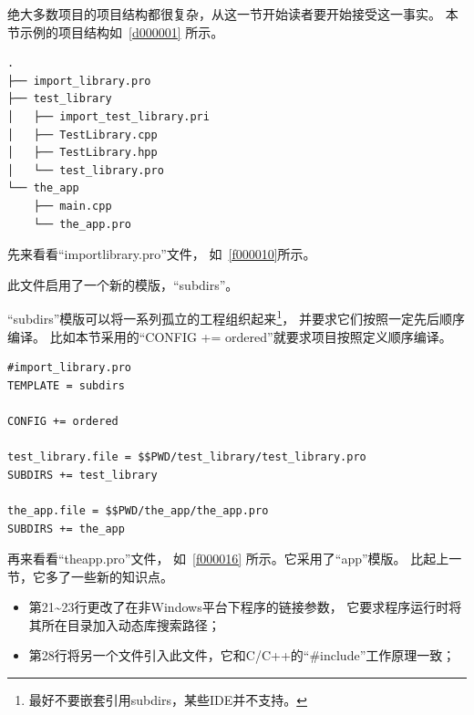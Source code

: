 绝大多数项目的项目结构都很复杂，从这一节开始读者要开始接受这一事实。
本节示例的项目结构如\treeindexnumbernameone\ \ref{d000001}
所示。

\label{d000001}    %
\begin{lstlisting}[caption=GoodLuck,
numbers=none,
title=\treeindexnumbernameone \thetreeindexnumber
]
.
├── import_library.pro
├── test_library
│   ├── import_test_library.pri
│   ├── TestLibrary.cpp
│   ├── TestLibrary.hpp
│   └── test_library.pro
└── the_app
    ├── main.cpp
    └── the_app.pro
\end{lstlisting}          %


先来看看“import\underline{\hspace{0.5em}}library.pro”文件，
如\lstlistingname\ \ref{f000010}所示。

此文件启用了一个新的模版，“subdirs”。

“subdirs”模版可以将一系列孤立的工程组织起来\footnote{
最好不要嵌套引用subdirs，某些IDE并不支持。
}，
并要求它们按照一定先后顺序编译。
比如本节采用的“CONFIG += ordered”就要求项目按照定义顺序编译。

\begin{lstlisting}[label=f000010,
caption=GoodLuck,
title=\lstlistingname\ \thelstlisting
]
#import_library.pro
TEMPLATE = subdirs

CONFIG += ordered

test_library.file = $$PWD/test_library/test_library.pro
SUBDIRS += test_library

the_app.file = $$PWD/the_app/the_app.pro
SUBDIRS += the_app
\end{lstlisting}          %


再来看看“the\underline{\hspace{0.5em}}app.pro”文件，
如\lstlistingname\ \ref{f000016} 所示。它采用了“app”模版。
比起上一节，它多了一些新的知识点。
\begin{itemize}
\item 第21\~{}23行更改了在非Windows平台下程序的链接参数，
它要求程序运行时将其所在目录加入动态库搜索路径；
\item 第28行将另一个文件引入此文件，它和C/C++的“\#include”工作原理一致；
\end{itemize}

